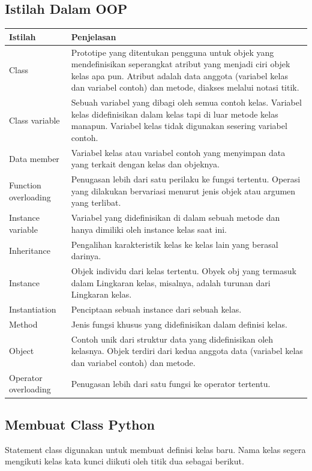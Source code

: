 \subsection{Istilah Dalam OOP}
\begin{center}
\begin{tabular}{ | m{3cm} | m{7cm} | }
\hline
Istilah & Penjelasan \\
\hline
Class & Prototipe yang ditentukan pengguna untuk objek yang mendefinisikan seperangkat atribut yang menjadi ciri objek kelas apa pun. Atribut adalah data anggota (variabel kelas dan variabel contoh) dan metode, diakses melalui notasi titik. \\
\hline
Class variable & Sebuah variabel yang dibagi oleh semua contoh kelas. Variabel kelas didefinisikan dalam kelas tapi di luar metode kelas manapun. Variabel kelas tidak digunakan sesering variabel contoh. \\
\hline
Data member & Variabel kelas atau variabel contoh yang menyimpan data yang terkait dengan kelas dan objeknya. \\
\hline
Function overloading & Penugasan lebih dari satu perilaku ke fungsi tertentu. Operasi yang dilakukan bervariasi menurut jenis objek atau argumen yang terlibat. \\
\hline
Instance variable & Variabel yang didefinisikan di dalam sebuah metode dan hanya dimiliki oleh instance kelas saat ini. \\
\hline
Inheritance & Pengalihan karakteristik kelas ke kelas lain yang berasal darinya. \\
\hline
Instance & Objek individu dari kelas tertentu. Obyek obj yang termasuk dalam Lingkaran kelas, misalnya, adalah turunan dari Lingkaran kelas. \\
\hline
Instantiation & Penciptaan sebuah instance dari sebuah kelas. \\
\hline
Method & Jenis fungsi khusus yang didefinisikan dalam definisi kelas. \\
\hline
Object & Contoh unik dari struktur data yang didefinisikan oleh kelasnya. Objek terdiri dari kedua anggota data (variabel kelas dan variabel contoh) dan metode. \\
\hline
Operator overloading & Penugasan lebih dari satu fungsi ke operator tertentu. \\
\hline
\end{tabular}
\end{center}

\subsection{Membuat Class Python}
Statement class digunakan untuk membuat definisi kelas baru. Nama kelas segera mengikuti kelas kata kunci diikuti oleh titik dua sebagai berikut.


